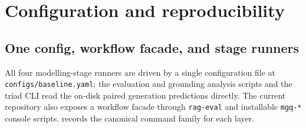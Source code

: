\documentclass[11pt,a4paper]{article}
\begin{document}
\clearpage
\printbibliography[heading=bibintoc,title={References}]

\clearpage
\appendix

\section{Configuration and reproducibility}
\label{sec:reproducibility}

\subsection{One config, workflow facade, and stage runners}

All four modelling-stage runners are driven by a single configuration file
at \texttt{configs/baseline.yaml}; the evaluation and grounding analysis scripts and
the triad CLI read the on-disk paired generation predictions directly.  The current repository
also exposes a workflow facade through \texttt{rag-eval} and
installable \texttt{mgq-*} console scripts.  
records the canonical command family for each layer.
\end{document}
